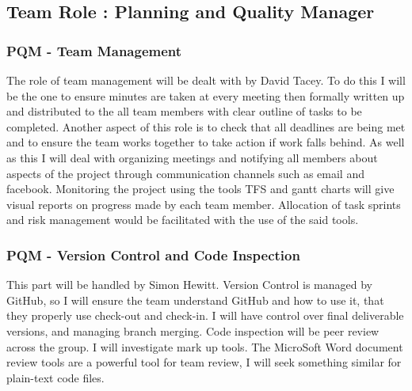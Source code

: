 \documentclass{article}
\begin{document}
\begin{comment}
Software testing is a combinatorial problem. For example, every boolean decision statement requires at least two tests: one with an outcome of "true" and one with an outcome of "false". As a result, for every line of code written, programmers often need 3 to 5 lines of test code.\cite{myers2011art} This obviously takes time and its investment may not be worth the effort. There are also many problems that cannot easily be tested at all – for example those that are nondeterministic or involve multiple threads. In addition, code for a unit test is likely to be at least as buggy as the code it is testing. 
\end{comment}



\newpage
\subsection{Team Role : Planning and Quality Manager}

\subsubsection{PQM - Team Management}
The role of team management will be dealt with by David Tacey. To do this I will be the one to ensure minutes are taken at every meeting then formally written up and distributed to the all team members with clear outline of tasks to be completed. Another aspect of this role is to check that all deadlines are being met and to ensure the team works together to take action if work falls behind. As well as this I will deal with organizing meetings and notifying all members about aspects of the project through communication channels such as email and facebook. Monitoring the project using the tools TFS and gantt charts will give visual reports on progress made by each team member. Allocation of task sprints and risk management would be facilitated with the use of the said tools.
\subsubsection{PQM - Version Control and Code Inspection}
This part will be handled by Simon Hewitt. Version Control is managed by GitHub, so I will ensure the team understand GitHub and how to use it, that they properly use check-out and check-in. I will have control over final deliverable versions, and managing branch merging.
Code inspection will be peer review across the group. I will investigate mark up tools. The MicroSoft Word document review tools are a powerful tool for team review, I will seek something similar for plain-text code files. 
\end{document}
